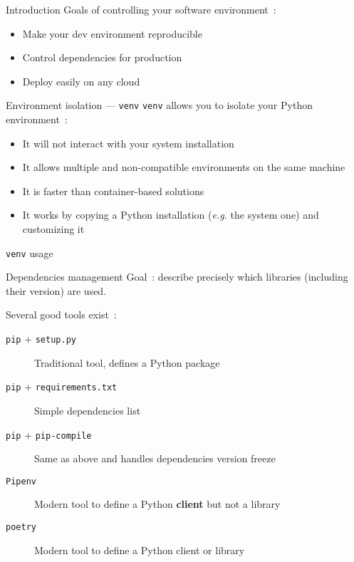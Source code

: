 \begin{frame}{Introduction}
  Goals of controlling your software environment~:
  \begin{itemize}
    \item Make your dev environment reproducible
    \item Control dependencies for production
    \item Deploy easily on any cloud
  \end{itemize}
\end{frame}

\begin{frame}{Environment isolation --- \texttt{venv}}
  \texttt{venv} allows you to isolate your Python environment~:
  \begin{itemize}
    \item It will not interact with your system installation
    \item It allows multiple and non-compatible environments on the same machine
    \item It is faster than container-based solutions
    \item It works by copying a Python installation (\textit{e.g.} the system one) and customizing it
  \end{itemize}
\end{frame}

\begin{frame}{\texttt{venv} usage}
\end{frame}

\begin{frame}{Dependencies management}
  Goal~: describe precisely which libraries (including their version) are used.

  Several good tools exist~:

  \begin{description}
    \item[\texttt{pip} + \texttt{setup.py}] Traditional tool, defines a Python package
    \item[\texttt{pip} + \texttt{requirements.txt}] Simple dependencies list
    \item[\texttt{pip} + \texttt{pip-compile}] Same as above and handles dependencies version freeze
    \item[\texttt{Pipenv}] Modern tool to define a Python \textbf{client} but not a library
    \item[\texttt{poetry}] Modern tool to define a Python client or library
  \end{description}
\end{frame}


